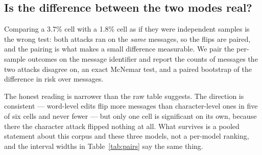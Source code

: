\subsection{Is the difference between the two modes real?}
\label{sec:pairs}

Comparing a 3.7\% cell with a 1.8\% cell as if they were independent samples is
the wrong test: both attacks ran on the \emph{same} messages, so the flips are
paired, and the pairing is what makes a small difference measurable. We pair the
per-sample outcomes on the message identifier and report the counts of messages
the two attacks disagree on, an exact McNemar test, and a paired bootstrap of the
difference in risk over messages.





The honest reading is narrower than the raw table suggests. The direction is
consistent --- word-level edits flip more messages than character-level ones in
five of six cells and never fewer --- but only one cell is significant on its
own, because there the character attack flipped nothing at all. What survives is
a pooled statement about this corpus and these three models, not a per-model
ranking, and the interval widths in Table~\ref{tab:pairs} say the same thing.
